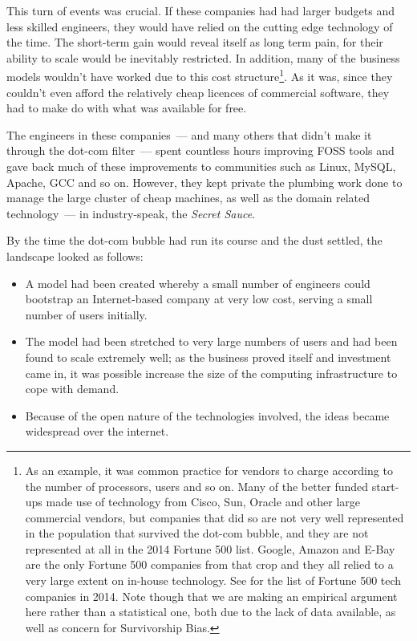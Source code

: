 \documentclass{book}
\begin{document}
This turn of events was crucial. If these companies had had larger
budgets and less skilled engineers, they would have relied on the
cutting edge technology of the time. The short-term gain would reveal
itself as long term pain, for their ability to scale would be
inevitably restricted. In addition, many of the business models
wouldn't have worked due to this cost structure\footnote{As an
  example, it was common practice for vendors to charge according to
  the number of processors, users and so on. Many of the better funded
  start-ups made use of technology from Cisco, Sun, Oracle and other
  large commercial vendors, but companies that did so are not very
  well represented in the population that survived the dot-com bubble,
  and they are not represented at all in the 2014 Fortune 500
  list. Google, Amazon and E-Bay are the only Fortune 500 companies
  from that crop and they all relied to a very large extent on
  in-house technology. See \cite{CRN01} for the list of Fortune 500
  tech companies in 2014. Note though that we are making an empirical
  argument here rather than a statistical one, both due to the lack of
  data available, as well as concern for Survivorship Bias.}. As it
was, since they couldn't even afford the relatively cheap licences of
commercial software, they had to make do with what was available for
free.

The engineers in these companies~--- and many others that didn't make
it through the dot-com filter~--- spent countless hours improving FOSS
tools and gave back much of these improvements to communities such as
Linux, MySQL, Apache, GCC and so on. However, they kept private the
plumbing work done to manage the large cluster of cheap machines, as
well as the domain related technology~--- in industry-speak, the
\emph{Secret Sauce}.

By the time the dot-com bubble had run its course and the dust
settled, the landscape looked as follows:

\begin{itemize}
\item A model had been created whereby a small number of engineers
  could bootstrap an Internet-based company at very low cost, serving
  a small number of users initially.
\item The model had been stretched to very large numbers of users and
  had been found to scale extremely well; as the business proved
  itself and investment came in, it was possible increase the size of
  the computing infrastructure to cope with demand.
\item Because of the open nature of the technologies involved, the
  ideas became widespread over the internet.
\end{itemize}
\end{document}
